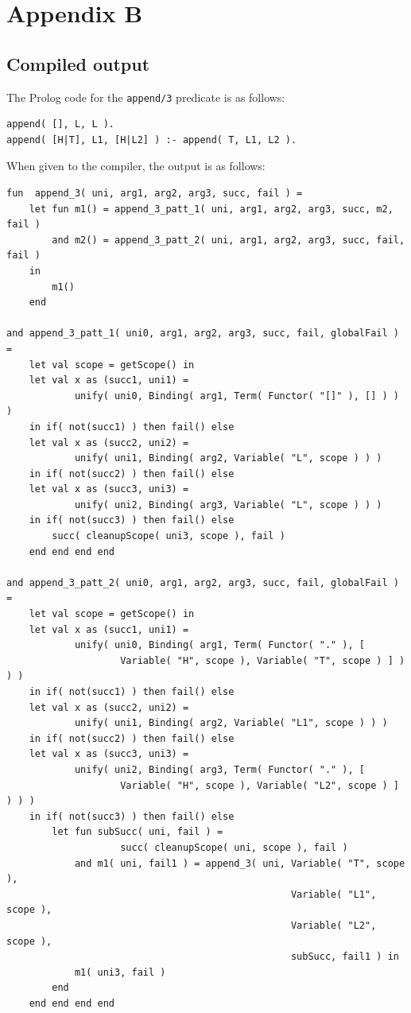 \documentclass[12pt]{article}
\begin{document}
\section*{Appendix B}

\subsection*{Compiled output}

The Prolog code for the \verb|append/3| predicate is as follows:

\begin{verbatim}
append( [], L, L ).
append( [H|T], L1, [H|L2] ) :- append( T, L1, L2 ).
\end{verbatim}

When given to the compiler, the output is as follows:

\begin{verbatim}
fun  append_3( uni, arg1, arg2, arg3, succ, fail ) = 
    let fun m1() = append_3_patt_1( uni, arg1, arg2, arg3, succ, m2, fail )
        and m2() = append_3_patt_2( uni, arg1, arg2, arg3, succ, fail, fail ) 
    in
        m1()
    end

and append_3_patt_1( uni0, arg1, arg2, arg3, succ, fail, globalFail ) = 
    let val scope = getScope() in
    let val x as (succ1, uni1) = 
            unify( uni0, Binding( arg1, Term( Functor( "[]" ), [] ) ) )
    in if( not(succ1) ) then fail() else
    let val x as (succ2, uni2) = 
            unify( uni1, Binding( arg2, Variable( "L", scope ) ) )
    in if( not(succ2) ) then fail() else
    let val x as (succ3, uni3) = 
            unify( uni2, Binding( arg3, Variable( "L", scope ) ) )
    in if( not(succ3) ) then fail() else
        succ( cleanupScope( uni3, scope ), fail )
    end end end end

and append_3_patt_2( uni0, arg1, arg2, arg3, succ, fail, globalFail ) = 
    let val scope = getScope() in
    let val x as (succ1, uni1) = 
            unify( uni0, Binding( arg1, Term( Functor( "." ), [ 
                    Variable( "H", scope ), Variable( "T", scope ) ] ) ) )
    in if( not(succ1) ) then fail() else
    let val x as (succ2, uni2) = 
            unify( uni1, Binding( arg2, Variable( "L1", scope ) ) )
    in if( not(succ2) ) then fail() else
    let val x as (succ3, uni3) = 
            unify( uni2, Binding( arg3, Term( Functor( "." ), [ 
                    Variable( "H", scope ), Variable( "L2", scope ) ] ) ) )
    in if( not(succ3) ) then fail() else
        let fun subSucc( uni, fail ) = 
                    succ( cleanupScope( uni, scope ), fail )
            and m1( uni, fail1 ) = append_3( uni, Variable( "T", scope ), 
                                                  Variable( "L1", scope ), 
                                                  Variable( "L2", scope ), 
                                                  subSucc, fail1 ) in
            m1( uni3, fail )
        end
    end end end end
\end{verbatim}
\end{document}
